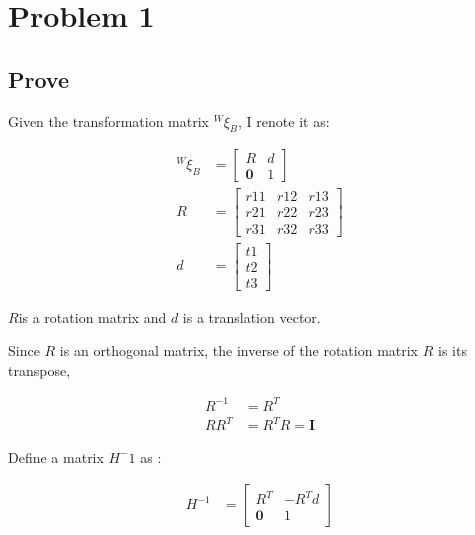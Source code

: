 \section{Problem 1}

\subsection{Prove}

Given the transformation matrix $^W\xi_B$, I renote it as:

\begin{equation}
    \begin{aligned}
        ^W\xi_B &=\begin{bmatrix} R & d \\ \boldsymbol{0} & 1 \end{bmatrix}\\
        R & = \begin{bmatrix} r11 & r12 & r13 \\ r21 & r22 & r23 \\r31 & r32 &r33 \end{bmatrix}\\
        d & = \begin{bmatrix} t1 \\ t2 \\t3 \end{bmatrix}
    \end{aligned}
\end{equation}

$R $is a rotation matrix and $d$ is a translation vector.

Since $R$ is an orthogonal matrix, the inverse of the rotation matrix $R$ is its transpose, 

\begin{equation}
    \begin{aligned}
        R^{-1} &= R^T\\
        RR^T&=R^TR= \boldsymbol{I}
    \end{aligned}
\end{equation}

Define a matrix $ H^-1 $ as :

\begin{equation}
    \begin{aligned}
        H^{-1} &= \begin{bmatrix} R^T & -R^Td \\ \boldsymbol{0} & 1 \end{bmatrix} 
    \end{aligned}
\end{equation}

